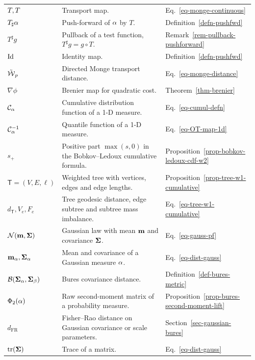 {\begin{longtable}{>{\raggedright\arraybackslash}p{}
                  >{\raggedright\arraybackslash}p{}
                  >{\raggedright\arraybackslash}p{}}
\hline
\multicolumn{3}{l}{\textbf{Monge maps, one-dimensional OT and Gaussians}}\\
\hline
$T,T$ & Transport map. & Eq.~\eqref{eq-monge-continuous} \\
$T_\sharp\alpha$ & Push-forward of $\alpha$ by $T$. & Definition~\ref{defn-pushfwd} \\
$T^\sharp g$ & Pullback of a test function, $T^\sharp g=g\circ T$. & Remark~\ref{rem-pullback-pushforward} \\
$\mathrm{Id}$ & Identity map. & Definition~\ref{defn-pushfwd} \\
$\tilde{\operatorname{\mathcal{W}}}_p$ & Directed Monge transport distance. & Eq.~\eqref{eq-monge-distance} \\
$\nabla\phi$ & Brenier map for quadratic cost. & Theorem~\ref{thm-brenier} \\
$\mathcal{C}_{\alpha}$ & Cumulative distribution function of a 1-D measure. & Eq.~\eqref{eq-cumul-defn} \\
$\mathcal{C}_{\alpha}^{-1}$ & Quantile function of a 1-D measure. & Eq.~\eqref{eq-OT-map-1d} \\
$s_+$ & Positive part $\max(s,0)$ in the Bobkov--Ledoux cumulative formula. & Proposition~\ref{prop-bobkov-ledoux-cdf-w2} \\
$\mathsf T=(V,E,\ell)$ & Weighted tree with vertices, edges and edge lengths. & Proposition~\ref{prop-tree-w1-cumulative} \\
$d_{\mathsf T},V_e,F_e$ & Tree geodesic distance, edge subtree and subtree mass imbalance. & Eq.~\eqref{eq-tree-w1-cumulative} \\
$\mathcal{N}(\mathbf{m},\mathbf{\Sigma})$ & Gaussian law with mean $\mathbf{m}$ and covariance $\mathbf{\Sigma}$. & Eq.~\eqref{eq-gauss-pf} \\
$\mathbf{m}_\alpha,\mathbf{\Sigma}_\alpha$ & Mean and covariance of a Gaussian measure $\alpha$. & Eq.~\eqref{eq-dist-gauss} \\
$\mathcal{B}(\mathbf{\Sigma}_\alpha,\mathbf{\Sigma}_\beta)$ & Bures covariance distance. & Definition~\ref{def-bures-metric} \\
$\Phi_2(\alpha)$ & Raw second-moment matrix of a probability measure. & Proposition~\ref{prop-bures-second-moment-lift} \\
$d_{\mathrm{FR}}$ & Fisher--Rao distance on Gaussian covariance or scale parameters. & Section~\ref{sec-gaussian-bures} \\
$\operatorname{tr}(\mathbf{\Sigma})$ & Trace of a matrix. & Eq.~\eqref{eq-dist-gauss} \\


\end{longtable}}
